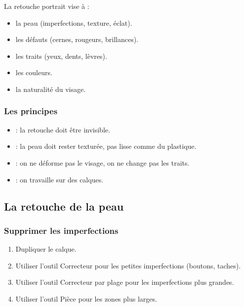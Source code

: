 La retouche portrait vise à :

\begin{itemize}
    \item {} la peau (imperfections, texture, éclat).
    \item {} les défauts (cernes, rougeurs, brillances).
    \item {} les traits (yeux, dents, lèvres).
    \item {} les couleurs.
    \item {} la naturalité du visage.
\end{itemize}

\subsubsection{Les principes}

\begin{itemize}
    \item {} : la retouche doit être invisible.
    \item {} : la peau doit rester texturée, pas lisse comme du plastique.
    \item {} : on ne déforme pas le visage, on ne change pas les traits.
    \item {} : on travaille sur des calques.
\end{itemize}

\subsection{La retouche de la peau}

\subsubsection{Supprimer les imperfections}

\begin{enumerate}
    \item Dupliquer le calque.
    \item Utiliser l'outil Correcteur pour les petites imperfections (boutons, taches).
    \item Utiliser l'outil Correcteur par plage pour les imperfections plus grandes.
    \item Utiliser l'outil Pièce pour les zones plus larges.
\end{enumerate}

